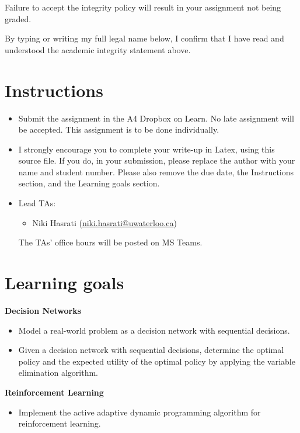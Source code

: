 \documentclass[12pt]{article}
\begin{document}
Failure to accept the integrity policy will result in your assignment not being graded.

By typing or writing my full legal name below, I confirm that I have read and understood the academic integrity statement above.



\newpage
\section*{Instructions}

\begin{itemize}
\item
Submit the assignment in the A4 Dropbox on Learn. 
No late assignment will be accepted. This assignment is to be done individually.

\item 
I strongly encourage you to complete your write-up in Latex, using this source file. If you do, in your submission, please replace the author with your name and student number. Please also remove the due date, the Instructions section, and the Learning goals section. 
\item
Lead TAs: 
\begin{itemize}
\item
Niki Hasrati (\href{mailto:niki.hasrati@uwaterloo.ca}{niki.hasrati@uwaterloo.ca})
\end{itemize}
The TAs' office hours will be posted on MS Teams.
\end{itemize}



\section*{Learning goals}

{\bf Decision Networks}

\begin{itemize}
\item 
Model a real-world problem as a decision network with sequential decisions.
\item
Given a decision network with sequential decisions, determine the optimal policy and the expected utility of the optimal policy by applying the variable elimination algorithm.
\end{itemize}

{\bf Reinforcement Learning}
\begin{itemize}
\item
Implement the active adaptive dynamic programming algorithm for reinforcement learning.
\end{itemize}
\end{document}
